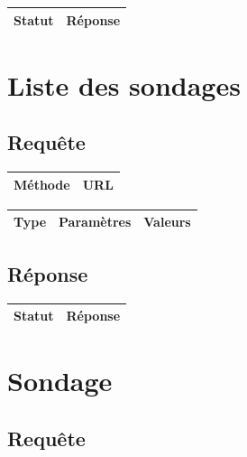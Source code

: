 \documentclass[titlepage]{report}
\begin{document}
\begin{center}
	\begin{tabular}{|c|c|}
		\hline
		Statut & Réponse \\
		\hline
		
	\end{tabular}
\end{center}


\chapter{Liste des sondages}

\section{Requête}

\begin{center}
	\begin{tabular}{|c|c|}
		\hline
		Méthode & URL \\
		\hline
		
	\end{tabular}
\end{center}


\begin{center}
	\begin{tabular}{|c|c|c|}
		\hline
		Type & Paramètres & Valeurs \\
		\hline
		
	\end{tabular}
\end{center}


\section{Réponse}

\begin{center}
	\begin{tabular}{|c|c|}
		\hline
		Statut & Réponse \\
		\hline
		
	\end{tabular}
\end{center}


\chapter{Sondage}

\section{Requête}
\end{document}
